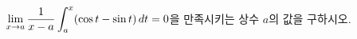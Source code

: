 \hspace*{2mm}\begin{minipage}[t]{\dimexpr\linewidth-2mm\relax}\vspace{0pt}
$\displaystyle\lim_{x\to a}\dfrac{1}{x-a}\int_{a}^{x}(\cos t-\sin t)\mkern3mu dt=0$을 만족시키는 상수 $a$의 값을 구하시오. \end{minipage}
